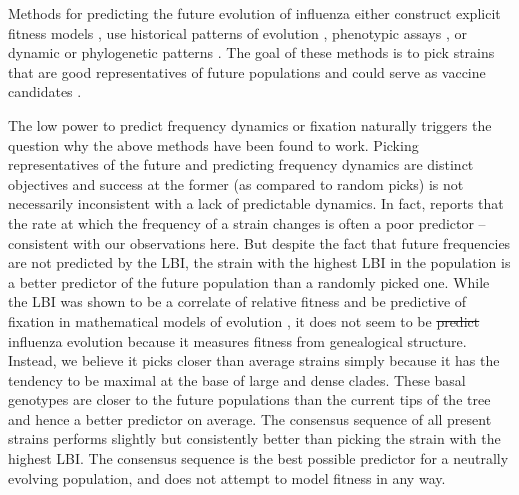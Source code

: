 \documentclass[reprint,amsmath,amssymb,superscriptaddress,showpacs,rmp]{revtex4-1}
\providecommand{\DIFadd}[1]{{\protect\color{blue}\uwave{#1}}} %
\providecommand{\DIFdel}[1]{{\protect\color{red}\sout{#1}}}                      %
\providecommand{\DIFaddbegin}{} %
\providecommand{\DIFaddend}{} %
\providecommand{\DIFdelbegin}{} %
\providecommand{\DIFdelend}{} %
\newcommand{\DIFscaledelfig}{0.5}
\newlength{\DIFdelgraphicswidth} %
\newlength{\DIFdelgraphicsheight} %
\newcommand{\DIFaddincludegraphics}[2][]{{\color{blue}\fbox{\DIFOincludegraphics[#1]{#2}}}} %
\newcommand{\DIFdelincludegraphics}[2][]{%
\sbox{\DIFdelgraphicsbox}{\DIFOincludegraphics[#1]{#2}}%
\settoboxwidth{\DIFdelgraphicswidth}{\DIFdelgraphicsbox} %
\settoboxtotalheight{\DIFdelgraphicsheight}{\DIFdelgraphicsbox} %
\scalebox{\DIFscaledelfig}{%
\parbox[b]{\DIFdelgraphicswidth}{\usebox{\DIFdelgraphicsbox}\\[-\baselineskip] \rule{\DIFdelgraphicswidth}{0em}}\llap{\resizebox{\DIFdelgraphicswidth}{\DIFdelgraphicsheight}{%
\setlength{\unitlength}{\DIFdelgraphicswidth}%
\begin{picture}(1,1)%
\thicklines\linethickness{2pt} %
{\color[rgb]{1,0,0}\put(0,0){\framebox(1,1){}}}%
{\color[rgb]{1,0,0}\put(0,0){\line( 1,1){1}}}%
{\color[rgb]{1,0,0}\put(0,1){\line(1,-1){1}}}%
\end{picture}%
}\hspace*{3pt}}} %
} %
\DeclareRobustCommand{\DIFaddbegin}{\DIFOaddbegin \let\includegraphics\DIFaddincludegraphics} %
\DeclareRobustCommand{\DIFaddend}{\DIFOaddend \let\includegraphics\DIFOincludegraphics} %
\DeclareRobustCommand{\DIFdelbegin}{\DIFOdelbegin \let\includegraphics\DIFdelincludegraphics} %
\DeclareRobustCommand{\DIFdelend}{\DIFOaddend \let\includegraphics\DIFOincludegraphics} %
\begin{document}

Methods for predicting the future evolution of influenza either construct explicit fitness models \citep{luksza_predictive_2014,huddleston_integrating_2020}, use historical patterns of evolution \citep{luksza_predictive_2014,bush_predicting_1999}, phenotypic assays \citep{neher_prediction_2016,steinbruck_inference_2012}, or dynamic or phylogenetic patterns \citep{neher_predicting_2014,klingen_sweep_2018}. 
The goal of these methods is to pick strains that are good representatives of future populations and could serve as vaccine candidates \citep{morris2018predictive}.


The low power to predict frequency dynamics or fixation naturally triggers the question why the above methods have been found to work. 
Picking representatives of the future and predicting frequency dynamics are distinct objectives and success at the former (as compared to random picks) is not necessarily inconsistent with a lack of predictable dynamics.
In fact, \citep{huddleston_integrating_2020} reports that the rate at which the frequency of a strain changes is often a poor predictor -- consistent with our observations here.
But despite the fact that future frequencies are not predicted by the LBI, the strain with the highest LBI in the population is a better predictor of the future population than a randomly picked one.
While the LBI was shown to be a correlate of relative fitness and be predictive of fixation in mathematical models of evolution \citep{neher_predicting_2014}, it does not seem to be \DIFdelbegin \DIFdel{predict }\DIFdelend \DIFaddbegin \DIFadd{predictive of }\DIFaddend influenza evolution because it measures fitness from genealogical structure.
Instead, we believe it picks closer than average strains simply because it has the tendency to be maximal at the base of large and dense clades. 
These basal genotypes are closer to the future populations than the current tips of the tree and hence a better predictor on average.
The consensus sequence of all present strains performs slightly but consistently better than picking the strain with the highest LBI. 
The consensus sequence is the best possible predictor for a neutrally evolving population, and does not attempt to model fitness in any way. 
\end{document}
